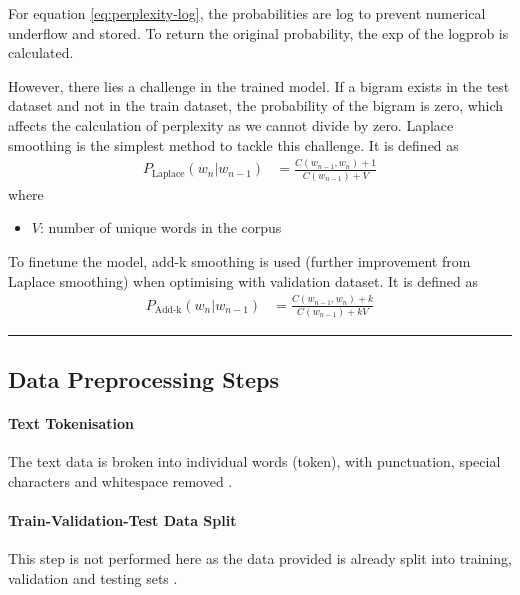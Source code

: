 For equation \ref{eq:perplexity-log}, the probabilities are log to prevent numerical underflow and stored. 
To return the original probability, the exp of the logprob is calculated.


However, there lies a challenge in the trained model. 
If a bigram exists in the test dataset and not in the train dataset, the probability of the bigram is zero, which affects the calculation of perplexity as we cannot divide by zero.
Laplace smoothing is the simplest method to tackle this challenge.
It is defined as 
\begin{align}
    P_{\text{Laplace}}(w_n | w_{n-1}) &=\frac{C(w_{n-1}, w_n) + 1}{C(w_{n-1}) + V}
\end{align}
where
\begin{itemize}
    \item $V$: number of unique words in the corpus
\end{itemize}

To finetune the model, add-k smoothing is used (further improvement from Laplace smoothing) when optimising with validation dataset. 
It is defined as 
\begin{align}
    P_{\text{Add-k}}(w_n | w_{n-1}) &=\frac{C(w_{n-1}, w_n) + k}{C(w_{n-1}) + kV}
    \label{eq:additive_smoothing}
\end{align}

\hrule




\subsection*{Data Preprocessing Steps}

\paragraph{Text Tokenisation}
The text data is broken into individual words (token), with punctuation, special characters and whitespace removed \cite{web:pre-processing}.

\paragraph{Train-Validation-Test Data Split}
This step is not performed here as the data provided is already split into training, validation and testing sets \cite{web:pre-processing}.





